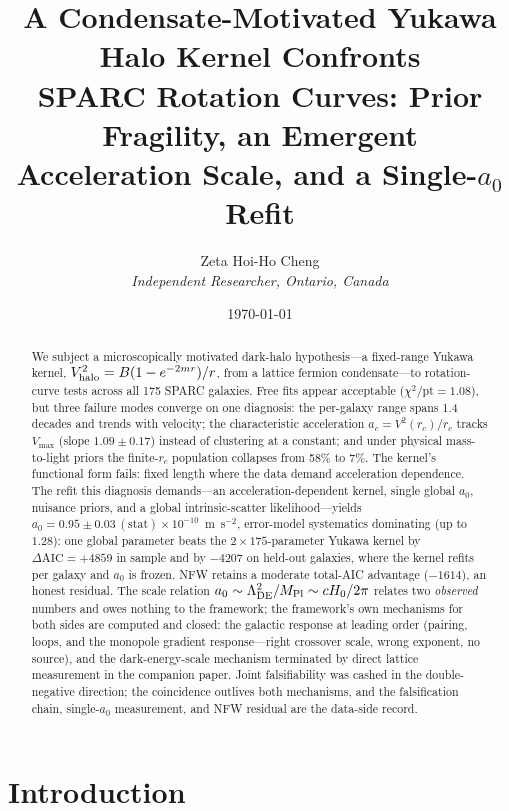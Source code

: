 \documentclass[11pt,a4paper]{article}
\title{\textbf{A Condensate-Motivated Yukawa Halo Kernel Confronts \\
SPARC Rotation Curves: Prior Fragility, an Emergent \\
Acceleration Scale, and a Single-$a_0$ Refit}}
\author{Zeta Hoi-Ho Cheng \\
\textit{Independent Researcher, Ontario, Canada}}
\date{\today}
\begin{document}
\maketitle

\begin{abstract}
We subject a microscopically motivated dark-halo hypothesis---a
fixed-range Yukawa kernel, $V_{\rm halo}^2 = B(1-e^{-2mr})/r$, from
a lattice fermion condensate---to rotation-curve tests across all
175 SPARC galaxies.
Free fits appear acceptable ($\chi^2/\mathrm{pt} = 1.08$), but
three failure modes converge on one diagnosis: the
per-galaxy range spans 1.4 decades and trends with velocity; the
characteristic acceleration $a_c = V^2(r_c)/r_c$ tracks $V_{\max}$
(slope $1.09\pm0.17$) instead of clustering at a constant; and under
physical mass-to-light priors the finite-$r_c$ population collapses
from 58\% to 7\%.  The kernel's functional form fails: fixed length where the data
demand acceleration dependence.
The refit this diagnosis demands---an acceleration-dependent
kernel, single global $a_0$, nuisance priors, and a global
intrinsic-scatter likelihood---yields
$a_0 = 0.95\pm0.03\,(\mathrm{stat})\times10^{-10}$~m~s$^{-2}$,
error-model systematics dominating (up to $1.28$): one global
parameter beats the $2\times175$-parameter Yukawa kernel by
$\Delta\mathrm{AIC} = +4859$ in sample and by $-4207$ on held-out
galaxies, where the kernel refits per galaxy and $a_0$ is frozen.
NFW retains a moderate total-AIC advantage ($-1614$), an honest
residual.
The scale relation
$a_0 \sim \Lambda_{\rm DE}^2/M_{\rm Pl} \sim cH_0/2\pi$ relates two
\emph{observed} numbers and owes nothing to the framework; the
framework's own mechanisms for both sides are computed and closed:
the galactic response at leading order (pairing, loops, and the
monopole gradient response---right crossover scale, wrong exponent,
no source), and the dark-energy-scale mechanism terminated by direct lattice
measurement in the companion paper.  Joint falsifiability was cashed in the double-negative direction;
the coincidence outlives both mechanisms, and the falsification
chain, single-$a_0$ measurement, and NFW residual are the data-side
record.
\end{abstract}


\section{Introduction}
\label{sec:intro}
\end{document}
